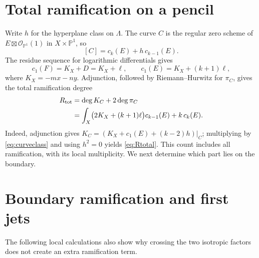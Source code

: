 \documentclass[11pt]{article}
\newcommand{\PP}{\mathbb P}
\newcommand{\OO}{\mathcal O}
\begin{document}
\section{Total ramification on a pencil}
Write $h$ for the hyperplane class on $\Lambda$. The curve $C$ is the
regular zero scheme of $E\boxtimes\OO_{\PP^1}(1)$ in $X\times\PP^1$,
so
\begin{equation}\label{eq:curveclass}
 [C]=c_k(E)+h\,c_{k-1}(E).
\end{equation}
The residue sequence for logarithmic differentials gives
\[
 c_1(F)=K_X+D=K_X+\ell,\qquad
 c_1(E)=K_X+(k+1)\ell,
\]
where $K_X=-mx-ny$. Adjunction, followed by Riemann--Hurwitz for
$\pi_C$, gives the total ramification degree
\begin{align}
 R_{\rm tot}
 &=\deg K_C+2\deg\pi_C \notag\\
 &=\int_X\bigl(2K_X+(k+1)\ell\bigr)c_{k-1}(E)
       +k\,c_k(E).\label{eq:Rtotal}
\end{align}
Indeed, adjunction gives
$K_C=(K_X+c_1(E)+(k-2)h)|_C$; multiplying by
\eqref{eq:curveclass} and using $h^2=0$ yields \eqref{eq:Rtotal}.
This count includes all ramification, with its local multiplicity.
We next determine which part lies on the boundary.

\section{Boundary ramification and first jets}
The following local calculations also show why crossing the two
isotropic factors does not create an extra ramification term.
\end{document}
